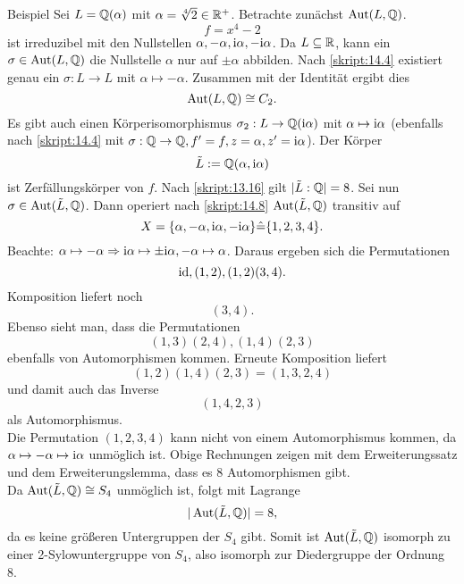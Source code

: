 \begin{genericdf}{Beispiel}\label{skript:14.9}
	Sei $L=\mathbb{Q}(\alpha)$ mit $\alpha=\sqrt[4]{2}\in\mathbb{R}^+$. Betrachte zunächst $\operatorname{Aut}(L,\mathbb{Q})$.
	\[f=x^4-2\]
	ist irreduzibel mit den Nullstellen $\alpha,-\alpha,\textrm{i}\alpha,-\textrm{i}\alpha$. Da $L\subseteq\mathbb{R}$, kann ein $\sigma\in\operatorname{Aut}(L,\mathbb{Q})$ die Nullstelle $\alpha$ nur auf $\pm\alpha$ abbilden. Nach \ref{skript:14.4} existiert genau ein $\sigma: L\to L$ mit $\alpha\mapsto-\alpha$. Zusammen mit der Identität ergibt dies
	\[\operatorname{Aut}(L,\mathbb{Q})\cong C_2.\]
	Es gibt auch einen Körperisomorphismus $\sigma_2: L\to\mathbb{Q}(\textrm{i}\alpha)$ mit $\alpha\mapsto\textrm{i}\alpha$ (ebenfalls nach \ref{skript:14.4} mit $\sigma:\mathbb{Q}\to\mathbb{Q}, f'=f,z=\alpha,z'=\textrm{i}\alpha$). Der Körper
	\[\tilde{L}:=\mathbb{Q}(\alpha,\textrm{i}\alpha)\]
	ist Zerfällungskörper von $f$. Nach \ref{skript:13.16} gilt $|\tilde{L}:\mathbb{Q}|=8$. Sei nun $\sigma\in\operatorname{Aut}(\tilde{L},\mathbb{Q})$. Dann operiert nach \ref{skript:14.8} $\operatorname{Aut}(\tilde{L},\mathbb{Q})$ transitiv auf
	\[X=\{\alpha,-\alpha,\textrm{i}\alpha,-\textrm{i}\alpha\}\hat{=}\{1,2,3,4\}.\]
	Beachte: $\alpha\mapsto-\alpha\Rightarrow\textrm{i}\alpha\mapsto\pm\textrm{i}\alpha,-\alpha\mapsto\alpha$. Daraus ergeben sich die Permutationen
	\[\operatorname{id}, (1,2), (1,2)(3,4).\]
	Komposition liefert noch
	\[(3,4).\]
	Ebenso sieht man, dass die Permutationen
	\[(1,3)(2,4), (1,4)(2,3)\]
	ebenfalls von Automorphismen kommen. Erneute Komposition liefert
	\[(1,2)(1,4)(2,3)=(1,3,2,4)\]
	und damit auch das Inverse
	\[(1,4,2,3)\]
	als Automorphismus.\\
	Die Permutation $(1,2,3,4)$ kann nicht von einem Automorphismus kommen, da $\alpha\mapsto-\alpha\mapsto\textrm{i}\alpha$ unmöglich ist. Obige Rechnungen zeigen mit dem Erweiterungssatz und dem Erweiterungslemma, dass es 8 Automorphismen gibt.\\
	Da $\operatorname{Aut}(\tilde{L},\mathbb{Q})\cong S_4$ unmöglich ist, folgt mit Lagrange
	\[|\operatorname{Aut}(\tilde{L},\mathbb{Q})|=8,\]
	da es keine größeren Untergruppen der $S_4$ gibt. Somit ist $\operatorname{Aut}(\tilde{L},\mathbb{Q})$ isomorph zu einer 2-Sylowuntergruppe von $S_4$, also isomorph zur Diedergruppe der Ordnung 8.
\end{genericdf}

